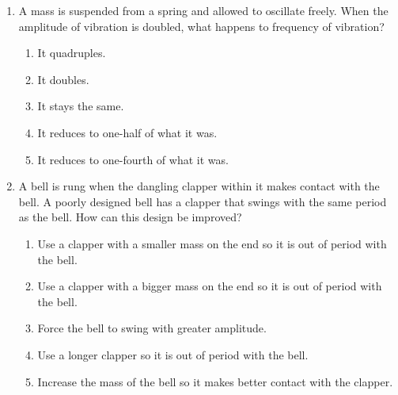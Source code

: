 \documentclass{../../../oss-apphys}
\begin{document}
\begin{multicols}{2}
\begin{enumerate}[leftmargin=18pt]
  \item A mass is suspended from a spring and allowed to oscillate freely. When
    the amplitude of vibration is doubled, what happens to frequency of
    vibration?
    \begin{enumerate}[noitemsep,topsep=0pt,leftmargin=18pt,label=(\Alph*)]
    \item It quadruples.
    \item It doubles.
    \item It stays the same.
    \item It reduces to one-half of what it was.
    \item It reduces to one-fourth of what it was.
    \end{enumerate}
    

    
    \columnbreak
    
  \item A bell is rung when the dangling clapper within it makes contact with
    the bell. A poorly designed bell has a clapper that swings with the same
    period as the bell. How can this design be improved?
    \begin{enumerate}[noitemsep,topsep=0pt,leftmargin=18pt,label=(\Alph*)]
    \item Use a clapper with a smaller mass on the end so it is out of period
      with the bell.
    \item Use a clapper with a bigger mass on the end so it is out of period
      with the bell.
    \item Force the bell to swing with greater amplitude.
    \item Use a longer clapper so it is out of period with the bell.
    \item Increase the mass of the bell so it makes better contact with the
      clapper.
    \end{enumerate}
%


\end{enumerate}
\end{multicols}
\end{document}
